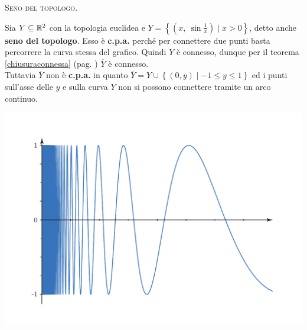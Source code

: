 \begin{example}\textsc{Seno del topologo.}\\
\begin{minipage}{0.47\textwidth}
Sia $Y\subseteq \mathbb{R}^2$ con la topologia euclidea e $Y=\left\{ \left( x,\ \sin\frac{1}{x} \right) \mid x>0 \right\}$, detto anche \textbf{seno del topologo}. Esso è \textbf{c.p.a.} perché per connettere due punti basta percorrere la curva stessa del grafico. Quindi $Y$ è connesso, dunque per il teorema \ref{chiusuraconnessa} (pag. \pageref{chiusuraconnessa}) $\overline{Y}$ è connesso.\\
Tuttavia $\overline{Y}$ non è \textbf{c.p.a.} in quanto $\overline{Y}=Y\cup \left\{ (0,y) \mid -1\leq y \leq 1 \right\}$ ed i punti sull'asse delle $y$ e sulla curva $Y$ non si possono connettere tramite un arco continuo.
\end{minipage}
\hspace{-7mm}
\begin{minipage}{0.52\textwidth}
	\includegraphics[trim=0cm 0.5cm 0.5cm 1.25cm,clip,scale=0.50]{images/topologistsine.pdf}
\end{minipage}
\end{example}
\vspace{6mm}
